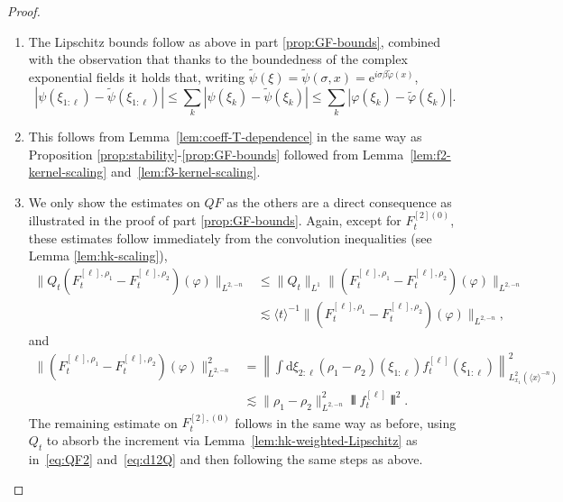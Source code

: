 \documentclass[11pt, a4paper]{scrartcl}
\numberwithin{equation}{section}
\theoremstyle{plain}
\theoremstyle{remark}
\newcommand{\mathD}{\mathrm{D}}
\newcommand{\mathd}{\mathrm{d}}
\newcommand{\mathe}{\mathrm{e}}
\newenvironment{enumeratealpha}{\begin{enumerate}[a{\textup{)}}] }{\end{enumerate}}
\begin{document}
\begin{proof}
\begin{enumeratealpha}
    Finally, the estimates on $H$ follow from the estimates above and
    \[ \begin{aligned}
         \| H_t (\varphi) \|_{L^{\infty}} &\leqslant  \frac{1}{2} 
         \sum_{\ell' + \ell'' > 3} \| \mathD (F^{[\ell]}_t  \dot{G}_t
         F^{[\ell'']}_t) (\varphi) \|_{L^{\infty}}\\
         & \lesssim  \sum_{\ell' + \ell'' > 3} \| \mathD F_t^{[\ell']} Q_t
         (Q_t F^{[\ell'']}_t) \|_{L^{\infty}} \lesssim \sum_{\ell' + \ell'' >
         3} (\bar{\lambda}_t \langle t \rangle^{- 1})^{\ell' + \ell''} .
       \end{aligned} \]
    \item The Lipschitz bounds follow as above in part \ref{prop:GF-bounds},
    combined with the observation that thanks to the boundedness of the
    complex exponential fields it holds that, writing $\tilde{\psi} (\xi) =
    \tilde{\psi} (\sigma, x) = \mathe^{i \sigma \beta \tilde{\varphi} (x)}$,
    \[ | \psi (\xi_{1 : \ell}) - \tilde{\psi} (\xi_{1 : \ell}) | \leqslant
       \sum_k | \psi (\xi_k) - \tilde{\psi} (\xi_k) | \leqslant \sum_k |
       \varphi (\xi_k) - \tilde{\varphi} (\xi_k) |. \]
    \item This follows from Lemma~\ref{lem:coeff-T-dependence} in the same way
    as Proposition \ref{prop:stability}-\ref{prop:GF-bounds} followed from
    Lemma~\ref{lem:f2-kernel-scaling} and~\ref{lem:f3-kernel-scaling}.
    
    \item We only show the estimates on $Q F$ as the others are a direct
    consequence as illustrated in the proof of part \ref{prop:GF-bounds}.
    Again, except for $F^{[2] (0)}_t$, these estimates follow immediately from
    the convolution inequalities (see Lemma \ref{lem:hk-scaling}),
    \[ \begin{aligned}
         \| Q_t (F_t^{[\ell], \rho_1} - F^{[\ell], \rho_2}_t) (\varphi)
         \|_{L^{2, - n}} &\leqslant  \| Q_t \|_{L^1} \| (F_t^{[\ell],
         \rho_1} - F^{[\ell], \rho_2}_t) (\varphi) \|_{L^{2, - n}}\\
         & \lesssim  \langle t \rangle^{- 1} \| (F_t^{[\ell], \rho_1} -
         F^{[\ell], \rho_2}_t) (\varphi) \|_{L^{2, - n}},
       \end{aligned} \]
    and
    \begin{align*}
        \| (F_t^{[\ell], \rho_1} - F^{[\ell], \rho_2}_t) (\varphi) \|_{L^{2,
        - n}}^2 & =  \left\| \int \mathd \xi_{2 : \ell} (\rho_1 - \rho_2)
        (\xi_{1 : \ell}) f^{[\ell]}_t (\xi_{1 : \ell}) \right\|_{L^2_{x_1}
        (\langle x \rangle^{- n})}^2\\
        & \lesssim \| \rho_1 - \rho_2 \|_{L^{2, - n}}^2 \interleave
        f_t^{[\ell]} \interleave^2 .
      \end{align*}
    The remaining estimate on $F^{[2], (0)}_t$ follows in the same way as
    before, using $Q_t$ to absorb the increment via
    Lemma~\ref{lem:hk-weighted-Lipschitz} as in~\eqref{eq:QF2}
    and~\eqref{eq:d12Q} and then following the same steps as above.
  \end{enumeratealpha}
\end{proof}
\end{document}
